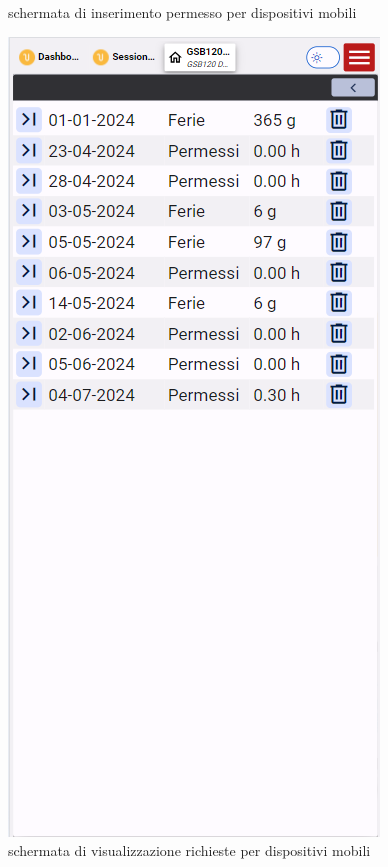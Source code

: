 \documentclass[target=bach,aauheader=,style=]{thud}
\begin{document}
\begin{figure}[H]
\begin{minipage}{0.25\textwidth}
        \caption{schermata di inserimento permesso per dispositivi mobili}
    \end{minipage}
    \hfill
    \begin{minipage}{0.25\textwidth}
        \centering
        \includegraphics[width=\linewidth]{screenshot/Mobile GSA081 da approvare.png}
        \caption{schermata di visualizzazione richieste per dispositivi mobili}
    \end{minipage}
\end{figure}
\end{document}
